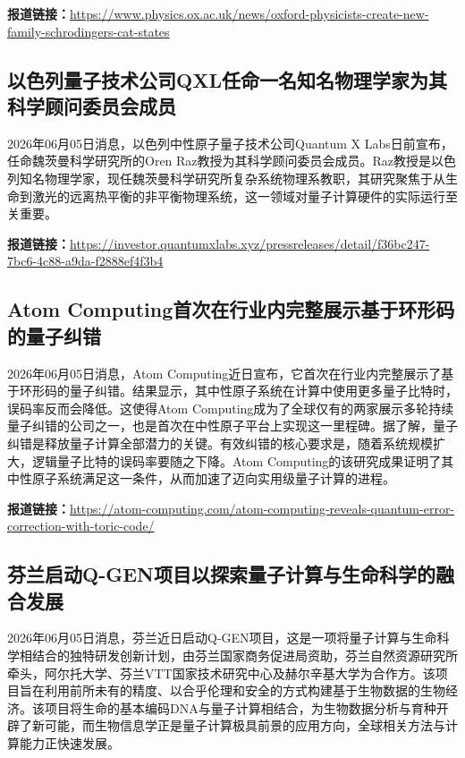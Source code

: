 \documentclass[12pt,a4paper]{ctexart}
\begin{document}
\noindent\textbf{报道链接：}\url{https://www.physics.ox.ac.uk/news/oxford-physicists-create-new-family-schrodingers-cat-states}

\subsection{ 以色列量子技术公司QXL任命一名知名物理学家为其科学顾问委员会成员 }

2026年06月05日消息，以色列中性原子量子技术公司Quantum X Labs日前宣布，任命魏茨曼科学研究所的Oren Raz教授为其科学顾问委员会成员。Raz教授是以色列知名物理学家，现任魏茨曼科学研究所复杂系统物理系教职，其研究聚焦于从生命到激光的远离热平衡的非平衡物理系统，这一领域对量子计算硬件的实际运行至关重要。

\noindent\textbf{报道链接：}\url{https://investor.quantumxlabs.xyz/pressreleases/detail/f36bc247-7bc6-4c88-a9da-f2888ef4f3b4}

\subsection{ Atom Computing首次在行业内完整展示基于环形码的量子纠错 }

2026年06月05日消息，Atom Computing近日宣布，它首次在行业内完整展示了基于环形码的量子纠错。结果显示，其中性原子系统在计算中使用更多量子比特时，误码率反而会降低。这使得Atom Computing成为了全球仅有的两家展示多轮持续量子纠错的公司之一，也是首次在中性原子平台上实现这一里程碑。据了解，量子纠错是释放量子计算全部潜力的关键。有效纠错的核心要求是，随着系统规模扩大，逻辑量子比特的误码率要随之下降。Atom Computing的该研究成果证明了其中性原子系统满足这一条件，从而加速了迈向实用级量子计算的进程。

\noindent\textbf{报道链接：}\url{https://atom-computing.com/atom-computing-reveals-quantum-error-correction-with-toric-code/}

\subsection{ 芬兰启动Q-GEN项目以探索量子计算与生命科学的融合发展 }

2026年06月05日消息，芬兰近日启动Q-GEN项目，这是一项将量子计算与生命科学相结合的独特研发创新计划，由芬兰国家商务促进局资助，芬兰自然资源研究所牵头，阿尔托大学、芬兰VTT国家技术研究中心及赫尔辛基大学为合作方。该项目旨在利用前所未有的精度、以合乎伦理和安全的方式构建基于生物数据的生物经济。该项目将生命的基本编码DNA与量子计算相结合，为生物数据分析与育种开辟了新可能，而生物信息学正是量子计算极具前景的应用方向，全球相关方法与计算能力正快速发展。
\end{document}
